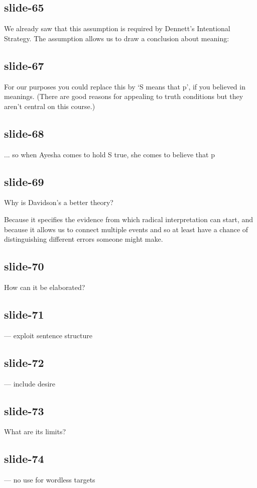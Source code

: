 \documentclass[12pt,\papersize]{extarticle}
\begin{document}
\subsection{slide-65}
We already saw that this assumption is required by Dennett’s Intentional Strategy.
The assumption allows us to draw a conclusion about meaning:

\subsection{slide-67}
For our purposes you could replace this by ‘S means that p’, if you
believed in meanings.
(There are good reasons for appealing to truth conditions but they aren’t
central on this course.)

\subsection{slide-68}
... so when Ayesha comes to hold S true, she comes to believe that p

\subsection{slide-69}
Why is Davidson’s a better theory?

Because it specifies the evidence from which radical interpretation can start,
and because it allows us to connect multiple events and so at least have a chance
of distinguishing different errors someone might make.

\subsection{slide-70}
How can it be elaborated?

\subsection{slide-71}
--- exploit sentence structure

\subsection{slide-72}
--- include desire

\subsection{slide-73}
What are its limits?

\subsection{slide-74}
--- no use for wordless targets
\end{document}
